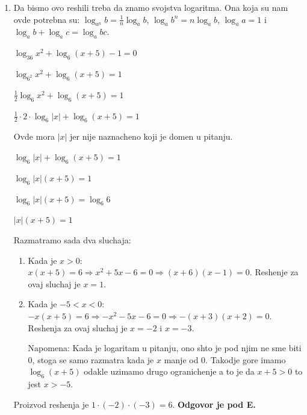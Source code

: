 \documentclass[a4paper,12pt]{article}
\begin{document}
\begin{enumerate}[1.]
\item Da bismo ovo reshili treba da znamo svojstva logaritma. Ona koja su nam ovde potrebna su: $\log_{a^n} b = \frac{1}{n} \log_a b$, $\log_a b^n = n \log_a b$, $\log_a a = 1$ i  $\log_a b + \log_a c = \log_a bc$.
\begin{center}
\par $ \log_{36} x^{2} + \log_6 (x + 5) -1 = 0$
\par $ \log_{6^2} x^{2} + \log_6 (x + 5) = 1$
\par $ \frac{1}{2} \log_6 x^{2} + \log_6 (x + 5) = 1$
\par $ \frac{1}{2} \cdot 2 \cdot \log_6 |x| + \log_6 (x + 5) = 1$
\end{center}
\par Ovde mora $|x|$ jer nije naznacheno koji je domen u pitanju.
\begin{center}
\par $ \log_6 |x| + \log_6 (x + 5) = 1$
\par $ \log_6 |x|(x + 5) = 1$
\par $ \log_6 |x|(x + 5) = \log_6 6$
\par $|x|(x + 5) = 1$
\end{center}
\par Razmatramo sada dva sluchaja:
\begin{enumerate}[1)]
\item Kada je $x > 0$: $x(x+5) = 6 \Longrightarrow x^2 + 5x -6 = 0 \Longrightarrow (x+6)(x-1)=0$. Reshenje za ovaj sluchaj je $x = 1$.
 
\item Kada je $-5 < x < 0$:  $-x(x+5) = 6 \Longrightarrow -x^2 - 5x -6 = 0 \Longrightarrow -(x+3)(x+2)=0$. Reshenja za ovaj sluchaj je $x = -2$ i  $x = -3$.
\par Napomena: Kada je logaritam u pitanju, ono shto je pod njim ne sme biti 0, stoga se samo razmatra kada je $x$ manje od 0. Takodje gore imamo $\log_6 (x+5)$ odakle uzimamo drugo ogranichenje a to je da $x+5>0$ to jest $ x > -5$.
\end{enumerate}
\par Proizvod reshenja je $1 \cdot (-2) \cdot (-3) = 6$. \textbf{Odgovor je pod E.} 



\end{enumerate}
\end{document}
